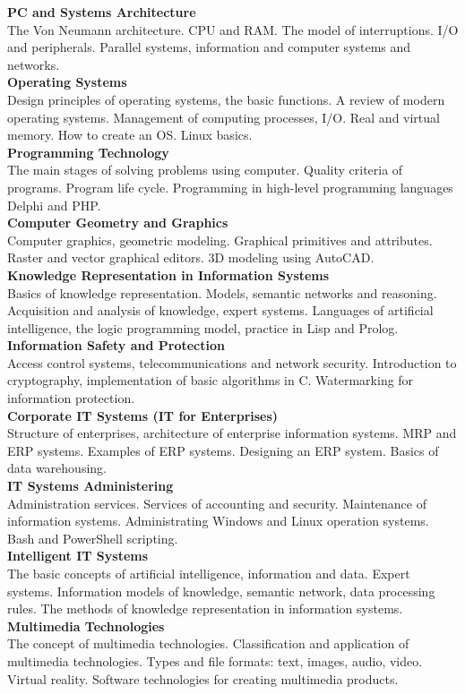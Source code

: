 \documentclass[a4paper, 12pt]{article}
\newcommand{\discipline}[1] {\textbf{#1} \\ }
\newcommand{\desc}[1] { #1 \\ }
\begin{document}
\discipline{PC and Systems Architecture}
\desc{The Von Neumann architecture. CPU and RAM. The model of interruptions. I/O and peripherals. Parallel systems, information and computer systems and networks.}

\discipline{Operating Systems}
\desc{Design principles of operating systems, the basic functions. A review of modern operating systems. Management of computing processes, I/O. Real and virtual memory. How to create an OS. Linux basics.}

\discipline{Programming Technology}
\desc{The main stages of solving problems using computer. Quality criteria of programs. Program life cycle. Programming in high-level programming languages Delphi and PHP.}

\discipline{Computer Geometry and Graphics}
\desc{Computer graphics, geometric modeling. Graphical primitives and attributes. Raster and vector graphical editors. 3D modeling using AutoCAD.}

\discipline{Knowledge Representation in Information Systems}
\desc{Basics of knowledge representation. Models, semantic networks and reasoning. Acquisition and analysis of knowledge, expert systems. Languages of artificial intelligence, the logic programming model, practice in Lisp and Prolog.}

\discipline{Information Safety and Protection}
\desc{Access control systems, telecommunications and network security. Introduction to cryptography, implementation of basic algorithms in C. Watermarking for information protection.}

\discipline{Corporate IT Systems (IT for Enterprises)}
\desc{Structure of enterprises, architecture of enterprise information systems. MRP and ERP systems. Examples of ERP systems. Designing an ERP system. Basics of data warehousing.}

\discipline{IT Systems Administering}
\desc{Administration services. Services of accounting and security. Maintenance of information systems. Administrating Windows and Linux operation systems. Bash and PowerShell scripting.}

\discipline{Intelligent IT Systems}
\desc{The basic concepts of artificial intelligence, information and data. Expert systems. Information models of knowledge, semantic network, data processing rules. The methods of knowledge representation in information systems.}

\discipline{Multimedia Technologies}
\desc{The concept of multimedia technologies. Classification and application of multimedia technologies. Types and file formats: text, images, audio, video. Virtual reality. Software technologies for creating multimedia products.}
\end{document}
